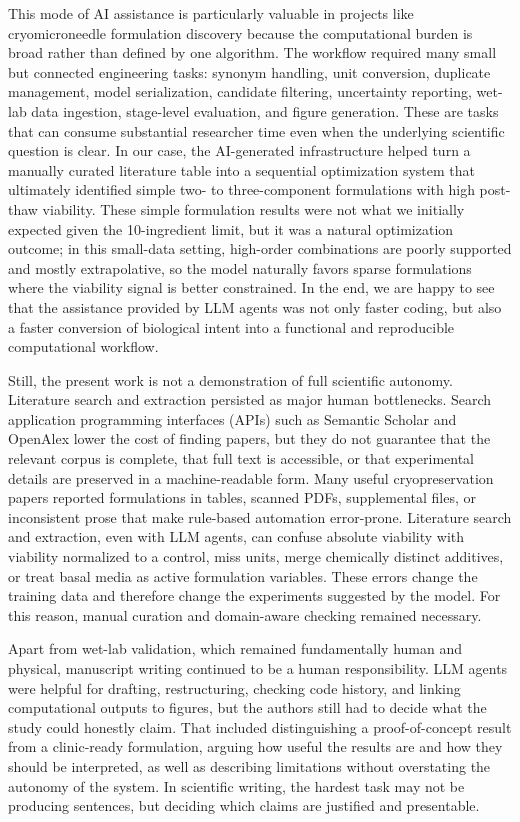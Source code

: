 \documentclass[11pt]{article}
\begin{document}
This mode of AI assistance is particularly valuable in projects like cryomicroneedle formulation discovery because the computational burden is broad rather than defined by one algorithm. The workflow required many small but connected engineering tasks: synonym handling, unit conversion, duplicate management, model serialization, candidate filtering, uncertainty reporting, wet-lab data ingestion, stage-level evaluation, and figure generation. These are tasks that can consume substantial researcher time even when the underlying scientific question is clear. In our case, the AI-generated infrastructure helped turn a manually curated literature table into a sequential optimization system that ultimately identified simple two- to three-component formulations with high post-thaw viability. These simple formulation results were not what we initially expected given the 10-ingredient limit, but it was a natural optimization outcome; in this small-data setting, high-order combinations are poorly supported and mostly extrapolative, so the model naturally favors sparse formulations where the viability signal is better constrained. In the end, we are happy to see that the assistance provided by LLM agents was not only faster coding, but also a faster conversion of biological intent into a functional and reproducible computational workflow.

Still, the present work is not a demonstration of full scientific autonomy. Literature search and extraction persisted as major human bottlenecks. Search application programming interfaces (APIs) such as Semantic Scholar and OpenAlex lower the cost of finding papers, but they do not guarantee that the relevant corpus is complete, that full text is accessible, or that experimental details are preserved in a machine-readable form.\cite{fricke_semantic_scholar_2018,priem_openalex_2022} Many useful cryopreservation papers reported formulations in tables, scanned PDFs, supplemental files, or inconsistent prose that make rule-based automation error-prone. Literature search and extraction, even with LLM agents, can confuse absolute viability with viability normalized to a control, miss units, merge chemically distinct additives, or treat basal media as active formulation variables. These errors change the training data and therefore change the experiments suggested by the model. For this reason, manual curation and domain-aware checking remained necessary.

Apart from wet-lab validation, which remained fundamentally human and physical, manuscript writing continued to be a human responsibility. LLM agents were helpful for drafting, restructuring, checking code history, and linking computational outputs to figures, but the authors still had to decide what the study could honestly claim. That included distinguishing a proof-of-concept result from a clinic-ready formulation, arguing how useful the results are and how they should be interpreted, as well as describing limitations without overstating the autonomy of the system. In scientific writing, the hardest task may not be producing sentences, but deciding which claims are justified and presentable.
\end{document}
